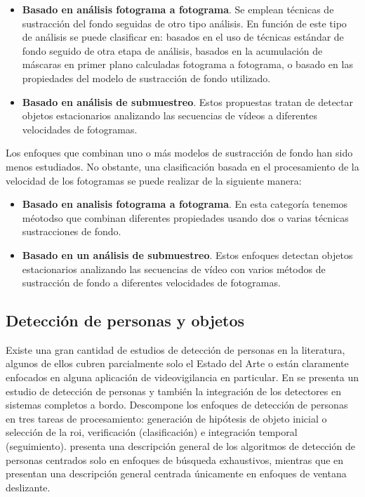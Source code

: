 \begin{itemize}
    \item \textbf{Basado en análisis fotograma a fotograma}. Se emplean técnicas de sustracción del fondo seguidas de otro tipo análisis. En función de este tipo de análisis se puede clasificar en: basados en el uso de técnicas estándar de fondo seguido de otra etapa de análisis, basados en la acumulación de máscaras en primer plano calculadas fotograma a fotograma, o basado en las propiedades del modelo de sustracción de fondo utilizado.
    \item \textbf{Basado en análisis de submuestreo}. Estos propuestas tratan de detectar objetos estacionarios analizando las secuencias de vídeos a diferentes velocidades de fotogramas. 
\end{itemize}

Los enfoques que combinan uno o más modelos de sustracción de fondo han sido menos estudiados. No obstante, una clasificación basada en el procesamiento de la velocidad de los fotogramas se puede realizar de la siguiente manera:

\begin{itemize}
    \item \textbf{Basado en analisis fotograma a fotograma}. En esta categoría tenemos méotodso que combinan diferentes propiedades usando dos o varias técnicas sustracciones de fondo.
    \item \textbf{Basado en un análisis de submuestreo}. Estos enfoques detectan objetos estacionarios analizando las secuencias de vídeo con varios métodos de sustracción de fondo a diferentes velocidades de fotogramas.
\end{itemize}

\subsection{Detección de personas y objetos}
\label{subsec:tecnicas-deteccion-personas-objetos}

Existe una gran cantidad de estudios de detección de personas en la literatura, algunos de ellos cubren parcialmente solo el Estado del Arte o están claramente enfocados en alguna aplicación de videovigilancia en particular. En \cite{4657363} se presenta un estudio de detección de personas y también la integración de los detectores en sistemas completos a bordo. Descompone los enfoques de detección de personas en tres tareas de procesamiento: generación de hipótesis de objeto inicial o selección de la \gls{roi}, verificación (clasificación) e integración temporal (seguimiento). \cite{simonnet2012} presenta una descripción general de los algoritmos de detección de personas centrados solo en enfoques de búsqueda exhaustivos, mientras que en \cite{5975165} presentan una descripción general centrada únicamente en enfoques de ventana deslizante.

